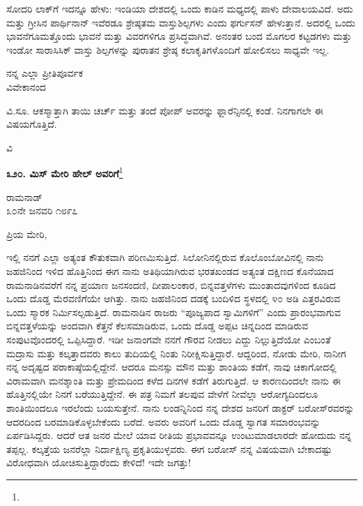 ಸೋದರಿ ಲಾಕ್‌ಗೆ ಇದನ್ನೂ ಹೇಳು: ಇಂಡಿಯಾ ದೇಶದಲ್ಲಿ ಒಂದು ಕಾಡಿನ ಮಧ್ಯದಲ್ಲಿ ಪಾಳು ದೇವಾಲಯವಿದೆ. ಅದು ಮತ್ತು ಗ್ರೀಸಿನ ಪಾರ್ಥಿನಾನ್ ಇವೆರಡೂ ಶ್ರೇಷ್ಠತಮ ವಾಸ್ತುಶಿಲ್ಪಗಳು\enginline{-} ಎಂದು ಫರ್ಗುಸನ್ ಹೇಳುತ್ತಾನೆ. ಅದರಲ್ಲಿ ಒಂದು ಭಾವನೆಗೂ\break ಮತ್ತೊಂದು ಭಾವನೆ ಮತ್ತು ವಿವರಗಳಿಗೂ ಪ್ರಸಿದ್ಧವಾಗಿವೆ. ಅನಂತರ ಬಂದ ಮೊಗಲರ ಕಟ್ಟಡಗಳು ಮತ್ತು ಇಂಡೋ ಸಾರಾಸಿಸಿಕ್ ವಾಸ್ತು ಶಿಲ್ಪಗಳನ್ನು ಪುರಾತನ ಶ್ರೇಷ್ಠ ಕಲಾಕೃತಿಗಳೊಂದಿಗೆ ಹೋಲಿಸಲು ಸಾಧ್ಯವೇ ಇಲ್ಲ.

\vspace{-0.5cm}

\begin{flushright}
ನನ್ನ ಎಲ್ಲಾ ಪ್ರೀತಿಪೂರ್ವಕ\\ವಿವೇಕಾನಂದ
\end{flushright}

ವಿ.ಸೂ.\enginline{-} ಆಕಸ್ಮಾತ್ತಾಗಿ ತಾಯಿ ಚರ್ಚ್ ಮತ್ತು ತಂದೆ ಪೋಪ್ ಅವರನ್ನು ಫ್ಲಾರೆನ್ಸಿನಲ್ಲಿ ಕಂಡೆ. ನಿನಗಾಗಲೇ ಈ ವಿಷಯಗೊತ್ತಿದೆ.

\vspace{-0.5cm}

{\flushright
ವಿ\par}

\begin{center}
\textbf{೩೨೦. ಮಿಸ್ ಮೇರಿ ಹೇಲ್ ಅವರಿಗೆ}\footnote{}
\end{center}

\vspace{-0.5cm}

\begin{flushright}
ರಾಮನಾಡ್\\೩೦ನೇ ಜನವರಿ ೧೮೯೭
\end{flushright}

\noindent
ಪ್ರಿಯ ಮೇರಿ,

ಇಲ್ಲಿ ನನಗೆ ಎಲ್ಲಾ ಅತ್ಯಂತ ಕೌತುಕವಾಗಿ ಪರಿಣಮಿಸುತ್ತಿದೆ. ಸಿಲೋನಿನಲ್ಲಿರುವ ಕೊಲೊಂಬೋವಿನಲ್ಲಿ ನಾನು ಜಹಜಿನಿಂದ ಇಳಿದ ಹೊತ್ತಿನಿಂದ ಈಗ ನಾನು ಅತಿಥಿಯಾಗಿರುವ ಭರತಖಂಡದ ಅತ್ಯಂತ ದಕ್ಷಿಣದ ಕೊನೆಯಾದ ರಾಮನಾಡಿನವರೆಗೆ ನನ್ನ ಪ್ರಯಾಣ ಜನಸಂದಣಿ, ದೀಪಾಲಂಕಾರ, ಬಿನ್ನವತ್ತಳೆಗಳು ಮುಂತಾದವುಗಳಿಂದ ಕೂಡಿದ ಒಂದು ದೊಡ್ಡ ಮೆರವಣಿಗೆಯೇ ಆಗಿತ್ತು. ನಾನು ಜಹಜಿನಿಂದ ದಡಕ್ಕೆ ಬಂದಿಳಿದ ಸ್ಥಳದಲ್ಲಿ ೪೦ ಅಡಿ ಎತ್ತರವಿರುವ ಒಂದು ಸ್ಮಾರಕ ನಿರ್ಮಿಸಲ್ಪಡುತ್ತಿದೆ. ರಾಮನಾಡಿನ ರಾಜರು “ಪೂಜ್ಯಪಾದ ಸ್ವಾಮಿಗಳಿಗೆ” ಎಂದು ಪ್ರಾರಂಭವಾಗುವ ಬಿನ್ನವತ್ತಳೆಯನ್ನು ಅಂದವಾಗಿ ಕೆತ್ತನೆ ಕೆಲಸಮಾಡಿರುವ, ಒಂದು ದೊಡ್ಡ ಅಪ್ಪಟ ಚಿನ್ನದಿಂದ ಮಾಡಿರುವ ಸಂಪುಟವೊಂದರಲ್ಲಿ ಒಪ್ಪಿಸಿದ್ದಾರೆ. ಇಡೀ ಜನಾಂಗವೇ ನನಗೆ ಗೌರವ ನೀಡಲು ಎದ್ದು ನಿಲ್ಲುತ್ತಿದೆಯೋ ಎಂಬಂತೆ ಮದ್ರಾಸು ಮತ್ತು ಕಲ್ಕತ್ತಾದವರು ಕಾಲು ತುದಿಯಲ್ಲಿ ನಿಂತು ನಿರೀಕ್ಷಿಸುತ್ತಿದ್ದಾರೆ. ಆದ್ದರಿಂದ, ನೋಡು ಮೇರಿ, ನಾನೀಗ ನನ್ನ ಅದೃಷ್ಟದ ಪರಾಕಾಷ್ಠೆಯಲ್ಲಿದ್ದೇನೆ. ಆದರೂ ಮನಸ್ಸು ಮೌನ ಮತ್ತು ಶಾಂತಿಯ ಕಡೆಗೆ, ನಾವು ಚಿಕಾಗೋದಲ್ಲಿ ವಿರಾಮವಾಗಿ ಮನಶ್ಶಾಂತಿ ಮತ್ತು ಪ್ರೇಮದಿಂದ ಕಳೆದ ದಿನಗಳ ಕಡೆಗೆ ತಿರುಗುತ್ತಿದೆ. ಆ ಕಾರಣದಿಂದಲೇ ನಾನು ಈ ಹೊತ್ತಿನಲ್ಲಿಯೇ ನಿನಗೆ ಬರೆಯುತ್ತಿದ್ದೇನೆ. ಈ ಪತ್ರ ನಿಮಗೆ ತಲಪುವ ವೇಳೆಗೆ ನೀವೆಲ್ಲಾ ಆರೋಗ್ಯದಿಂದಲೂ ಶಾಂತಿಯಿಂದಲೂ ಇರಲೆಂದು ಬಯಸುತ್ತೇನೆ. ನಾನು ಲಂಡನ್ನಿನಿಂದ ನನ್ನ ದೇಶದ ಜನರಿಗೆ ಡಾಕ್ಟರ್ ಬರೋಸ್‌ರವರನ್ನು ಆದರದಿಂದ ಬರಮಾಡಿಕೊಳ್ಳಬೇಕೆಂದು ಬರೆದೆ. ಅವರು ಅವರಿಗೆ ಒಂದು ದೊಡ್ಡ ಸ್ವಾಗತ ಸಮಾರಂಭವನ್ನು ಏರ್ಪಡಿಸಿದ್ದರು. ಆದರೆ ಆತ ಜನರ ಮೇಲೆ ಯಾವ ರೀತಿಯ ಪ್ರಭಾವವನ್ನೂ ಉಂಟುಮಾಡಲಾರದೇ ಹೋದುದು ನನ್ನ ತಪ್ಪಲ್ಲ. ಕಲ್ಕತ್ತೆಯ ಜನರೆಲ್ಲಾ ನಿರ್ದಾಕ್ಷಿಣ್ಯ ಪ್ರಕೃತಿಯುಳ್ಳವರು. ಈಗ ಬರೋಸ್ ನನ್ನ ವಿಷಯವಾಗಿ ಬೇಕಾದಷ್ಟು ವಿರೋಧವಾಗಿ ಯೋಚಿಸುತ್ತಿದ್ದಾರೆಂದು ಕೇಳಿದೆ! ಇದೇ ಜಗತ್ತು!

